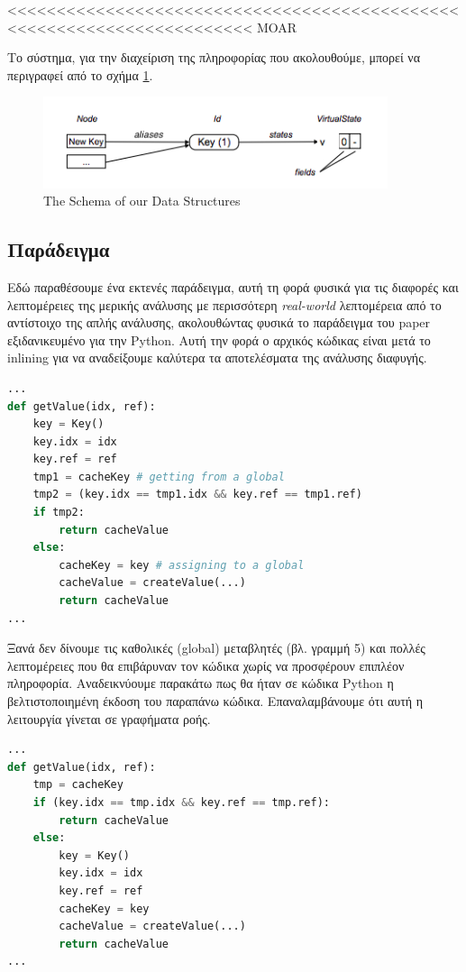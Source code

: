 <<<<<<<<<<<<<<<<<<<<<<<<<<<<<<<<<<<<<<<<<<<<<<<<<<<<<<<<<<<<<<<<<<<<<<< MOAR

Το σύστημα, για την διαχείριση της πληροφορίας που ακολουθούμε, μπορεί να
περιγραφεί από το σχήμα \ref{figure-6}.

\begin{figure}[h]
\centering
\includegraphics[width=0.9\textwidth]{DS-schema.png}
\caption{The Schema of our Data Structures}
\label{figure-6}
\end{figure}


\subsection{Παράδειγμα}

Εδώ παραθέσουμε ένα εκτενές παράδειγμα, αυτή τη φορά φυσικά για τις διαφορές και
λεπτομέρειες της μερικής ανάλυσης με περισσότερη \textit{real-world} λεπτομέρεια
από το αντίστοιχο της απλής ανάλυσης, ακολουθώντας φυσικά το παράδειγμα του
paper\cite{stadler2014partial} εξιδανικευμένο για την Python. Αυτή την φορά ο
αρχικός κώδικας είναι μετά το inlining για να αναδείξουμε καλύτερα τα
αποτελέσματα της ανάλυσης διαφυγής.

\begin{lstlisting}[language=Python]
...
def getValue(idx, ref):
    key = Key()
    key.idx = idx
    key.ref = ref
    tmp1 = cacheKey # getting from a global
    tmp2 = (key.idx == tmp1.idx && key.ref == tmp1.ref)
    if tmp2:
        return cacheValue
    else:
        cacheKey = key # assigning to a global
        cacheValue = createValue(...)
        return cacheValue
...
\end{lstlisting}

Ξανά δεν δίνουμε τις καθολικές (global) μεταβλητές (βλ. γραμμή 5) και πολλές
λεπτομέρειες που θα επιβάρυναν τον κώδικα χωρίς να προσφέρουν επιπλέον
πληροφορία. Αναδεικνύουμε παρακάτω πως θα ήταν σε κώδικα Python η
βελτιστοποιημένη έκδοση του παραπάνω κώδικα. Επαναλαμβάνουμε ότι αυτή η
λειτουργία γίνεται σε γραφήματα ροής.

\begin{lstlisting}[language=Python]
...
def getValue(idx, ref):
    tmp = cacheKey
    if (key.idx == tmp.idx && key.ref == tmp.ref):
        return cacheValue
    else:
        key = Key()
        key.idx = idx
        key.ref = ref
        cacheKey = key
        cacheValue = createValue(...)
        return cacheValue
...
\end{lstlisting}

